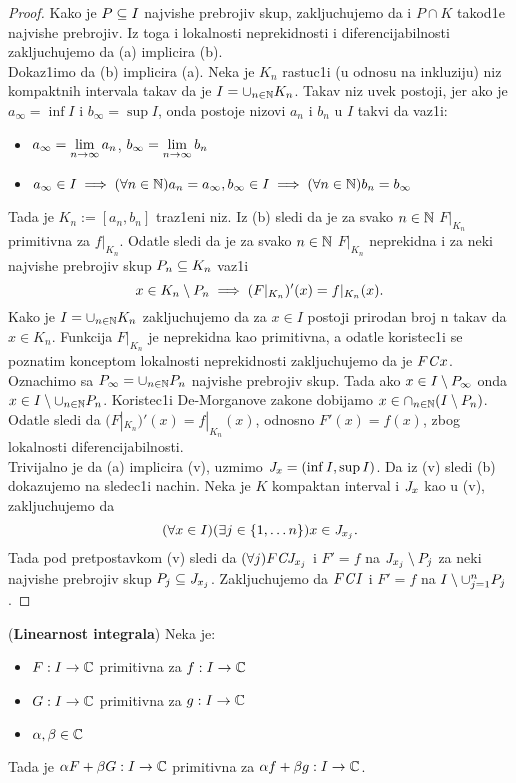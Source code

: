 \documentclass[../main.tex]{subfiles}
\begin{document}
\begin{proof}
Kako je $P\subseteq I$ najvishe prebrojiv skup, zakljuchujemo da i $P\cap K$ takod1e najvishe prebrojiv. 
Iz toga i lokalnosti neprekidnosti i diferencijabilnosti zakljuchujemo da (a) implicira (b).\\
Dokaz1imo da (b) implicira (a). Neka je $K_n$ rastuc1i (u odnosu na inkluziju) niz kompaktnih intervala takav da je $I=\cup_{n\in \mathbb{N}} K_n$.
Takav niz uvek postoji, jer ako je $a_{\infty} = \inf I$ i $b_{\infty} = \sup I$,
onda postoje nizovi $a_n$ i $b_n$ u $I$ takvi da vaz1i:
\begin{itemize}
        \item[\cdot] $a_{\infty} = \displaystyle{\lim_{n\to \infty}a_n}$,
        $b_{\infty} = \displaystyle{\lim_{n\to \infty}b_n}$
        \item[\cdot] $a_{\infty} \in I \implies (\forall n \in \mathbb{N}) a_n=a_{\infty}, b_{\infty} \in I \implies (\forall n \in \mathbb{N}) b_n=b_{\infty}$
\end{itemize} 
Tada je $K_n:=[a_n,b_n]$ traz1eni niz. Iz (b) sledi da je za svako $n\in \mathbb{N}$ $F|_{K_n}$ primitivna za $f|_{K_n}$.
Odatle sledi da je za svako $n\in \mathbb{N}$ $F|_{K_n}$ neprekidna i za neki najvishe prebrojiv skup $P_n\subseteq K_n$
vaz1i $$x\in K_n \setminus P_n \implies (F|_{K_n})'(x)=f|_{K_n}(x).$$ 
Kako je $I=\cup_{n\in \mathbb{N}} K_n$ zakljuchujemo da za $x \in I$ postoji prirodan broj n takav da $x \in K_n$.
Funkcija $F|_{K_n}$ je neprekidna kao primitivna, a odatle koristec1i se poznatim konceptom lokalnosti neprekidnosti zakljuchujemo da je $F\mathit{C} x$.
Oznachimo sa $P_{\infty}=\cup_{n\in \mathbb{N}}P_n$ najvishe prebrojiv skup. Tada ako $x\in I \setminus P_{\infty}$ onda $x\in I \setminus \cup_{n\in \mathbb{N}}P_n$.
Koristec1i De-Morganove zakone dobijamo $x\in \cap_{n\in \mathbb{N}}(I\setminus P_n)$. Odatle sledi da $(F|_{K_n})'(x)=f|_{K_n}(x)$, odnosno $F'(x)=f(x)$, zbog lokalnosti diferencijabilnosti.\\
Trivijalno je da (a) implicira (v), uzmimo $\mathit{J}_x = (\inf I, \sup I)$. Da iz (v) sledi (b) dokazujemo na sledec1i nachin. Neka je $K$ kompaktan interval i $\mathit{J}_x$ kao u (v),
zakljuchujemo da $$(\forall x \in I)(\exists j \in \{1, \dots n\}) x\in \mathit{J}_{x_j}.$$
Tada pod pretpostavkom (v) sledi da $(\forall j) F\mathit{C} \mathit{J}_{x_j}$ i $F'=f$ na $\mathit{J}_{x_j}\setminus P_j$ za neki najvishe prebrojiv skup $P_j \subseteq \mathit{J}_{x_j}$.
Zakljuchujemo da $F\mathit{C} I$ i $F'=f $ na $I\setminus
\cup_{j=1}^n P_j$.
\end{proof}
\begin{tvr}
(\textbf{Linearnost integrala}) Neka je:
\begin{itemize}
        \item[\cdot] $F:I\to \mathbb{C}$ primitivna za $f:I\to \mathbb{C}$
        \item[\cdot] $G:I\to \mathbb{C}$ primitivna za $g:I\to \mathbb{C}$
        \item[\cdot] $\alpha, \beta \in \mathbb{C}$
\end{itemize}
Tada je $\alpha F + \beta G:I\to \mathbb{C}$ primitivna za $\alpha f + \beta g: I \to \mathbb{C}$.
\end{tvr}
\end{document}
